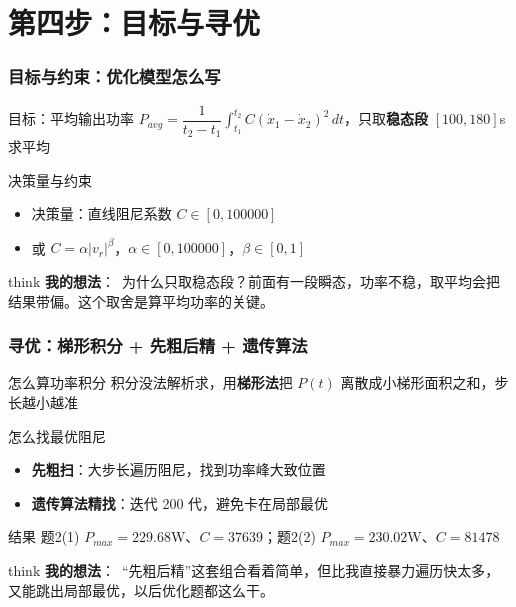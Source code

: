 \documentclass[aspectratio=169]{beamer}
\newcommand{\remark}[2]{%
	\vspace{0.12cm}%
	\begin{beamercolorbox}[rounded=true,sep=6pt]{think}%
		{\color{orchidpurple}\textbf{#1}：}~#2%
	\end{beamercolorbox}%
}
\begin{document}
\section{第四步：目标与寻优}
\begin{frame}
	\frametitle{目标与约束：优化模型怎么写}
	\scriptsize
	\begin{block}{目标：平均输出功率}
		$P_{avg}=\dfrac{1}{t_2-t_1}\int_{t_1}^{t_2} C(\dot x_1-\dot x_2)^2\,dt$，只取\textbf{稳态段} $[100,180]$s 求平均
	\end{block}
	\begin{block}{决策量与约束}
		\begin{itemize}
			\item 决策量：直线阻尼系数 $C\in[0,100000]$
			\item 或 $C=\alpha|v_r|^\beta$，$\alpha\in[0,100000]$，$\beta\in[0,1]$
		\end{itemize}
	\end{block}
	\remark{我的想法}{为什么只取稳态段？前面有一段瞬态，功率不稳，取平均会把结果带偏。这个取舍是算平均功率的关键。}
\end{frame}

\begin{frame}
	\frametitle{寻优：梯形积分 + 先粗后精 + 遗传算法}
	\scriptsize
	\begin{block}{怎么算功率积分}
		积分没法解析求，用\textbf{梯形法}把 $P(t)$ 离散成小梯形面积之和，步长越小越准
	\end{block}
	\begin{block}{怎么找最优阻尼}
		\begin{itemize}
			\item \textbf{先粗扫}：大步长遍历阻尼，找到功率峰大致位置
			\item \textbf{遗传算法精找}：迭代 200 代，避免卡在局部最优
		\end{itemize}
	\end{block}
	\begin{block}{结果}
		题2(1) $P_{max}=229.68$W、$C=37639$；题2(2) $P_{max}=230.02$W、$C=81478$
	\end{block}
	\remark{我的想法}{``先粗后精''这套组合看着简单，但比我直接暴力遍历快太多，又能跳出局部最优，以后优化题都这么干。}
\end{frame}

\end{document}
